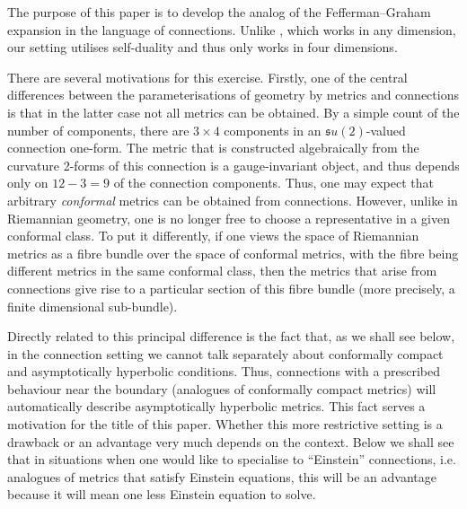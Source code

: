 \documentclass[a4paper,12pt]{article}
\begin{document}
The purpose of this paper is to develop the analog of the Fefferman--Graham expansion \cite{FG} in the language of connections. Unlike \cite{FG}, which works in any dimension, our setting utilises self-duality and thus only works in four dimensions. 

There are several motivations for this exercise. Firstly, one of the central differences between the parameterisations of geometry by metrics and connections is that in the latter case not all metrics can be obtained. By a simple count of the number of components, there are $3\times 4$ components in an ${\mathfrak su}(2)$-valued connection one-form. The metric that is constructed algebraically from the curvature 2-forms of this connection is a gauge-invariant object, and thus depends only on $12-3=9$ of the connection components. Thus, one may expect that arbitrary {\it conformal} metrics can be obtained from connections. However, unlike in Riemannian geometry,  one is no longer free to choose a representative in a given conformal class. To put it differently, if one views the space of Riemannian metrics as a fibre bundle over the space of conformal metrics, with the fibre being different metrics in the same conformal class, then the metrics that arise from connections give rise to a particular section of this fibre bundle (more precisely, a finite dimensional sub-bundle).

Directly related to this principal difference is the fact that, as we shall see below, in the connection setting we cannot talk separately about conformally compact and asymptotically hyperbolic conditions. Thus, connections with a prescribed behaviour near the boundary (analogues of conformally compact metrics) will automatically describe asymptotically hyperbolic metrics. This fact serves a motivation for the title of this paper. Whether this more restrictive setting is a drawback or an advantage very much depends on the context. Below we shall see that in situations when one would like to specialise to ``Einstein'' connections, i.e. analogues of metrics that satisfy Einstein equations, this will be an advantage because it will mean one less Einstein equation to solve.
\end{document}
